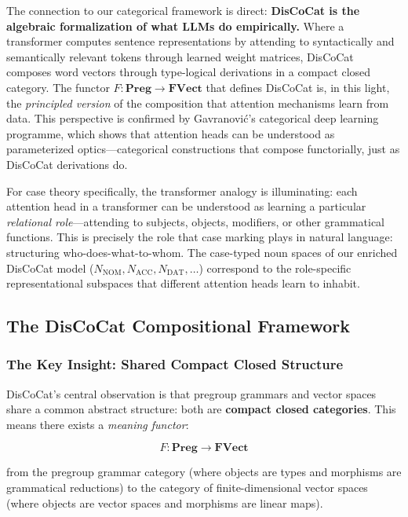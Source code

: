 \documentclass[
]{article}
\numberwithin{equation}{section}
\begin{document}
The connection to our categorical framework is direct: \textbf{DisCoCat
is the algebraic formalization of what LLMs do empirically.} Where a
transformer computes sentence representations by attending to
syntactically and semantically relevant tokens through learned weight
matrices, DisCoCat composes word vectors through type-logical
derivations in a compact closed category. The functor
\(F: \mathbf{Preg} \to \mathbf{FVect}\) that defines DisCoCat is, in
this light, the \emph{principled version} of the composition that
attention mechanisms learn from data. This perspective is confirmed by
Gavranović's \citeyearpar{gavranovic2024thesis} categorical deep
learning programme, which shows that attention heads can be understood
as parameterized optics---categorical constructions that compose
functorially, just as DisCoCat derivations do.

For case theory specifically, the transformer analogy is illuminating:
each attention head in a transformer can be understood as learning a
particular \emph{relational role}---attending to subjects, objects,
modifiers, or other grammatical functions. This is precisely the role
that case marking plays in natural language: structuring
who-does-what-to-whom. The case-typed noun spaces of our enriched
DisCoCat model
(\(N_{\text{NOM}}, N_{\text{ACC}}, N_{\text{DAT}}, \ldots\)) correspond
to the role-specific representational subspaces that different attention
heads learn to inhabit.

\subsection{The DisCoCat Compositional
Framework}\label{the-discocat-compositional-framework}

\subsubsection{The Key Insight: Shared Compact Closed
Structure}\label{the-key-insight-shared-compact-closed-structure}

DisCoCat's central observation is that pregroup grammars and vector
spaces share a common abstract structure: both are \textbf{compact
closed categories}. This means there exists a \emph{meaning functor}:

\[F: \mathbf{Preg} \to \mathbf{FVect} \tag{4.1}\]

from the pregroup grammar category (where objects are types and
morphisms are grammatical reductions) to the category of
finite-dimensional vector spaces (where objects are vector spaces and
morphisms are linear maps).
\end{document}
